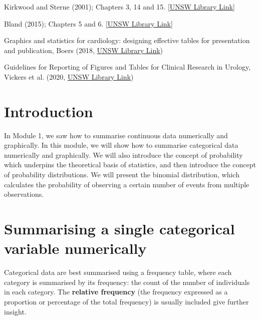 \documentclass[
  a4paper,
]{memoir}
\begin{document}

Kirkwood and Sterne (2001); Chapters 3, 14 and 15.
\href{http://er1.library.unsw.edu.au/er/cgi-bin/eraccess.cgi?url=https://ebookcentral.proquest.com/lib/unsw/detail.action?docID=624728}{{[}UNSW
Library Link{]}}

Bland (2015); Chapters 5 and 6.
\href{http://er1.library.unsw.edu.au/er/cgi-bin/eraccess.cgi?url=https://ebookcentral.proquest.com/lib/unsw/detail.action?docID=5891730}{{[}UNSW
Library Link{]}}

Graphics and statistics for cardiology: designing effective tables for
presentation and publication, Boers (2018,
\href{https://er1.library.unsw.edu.au/er/cgi-bin/eraccess.cgi?url=http://dx.doi.org/10.1136/heartjnl-2017-311581}{UNSW
Library Link})

Guidelines for Reporting of Figures and Tables for Clinical Research in
Urology, Vickers et al. (2020,
\href{https://er1.library.unsw.edu.au/er/cgi-bin/eraccess.cgi?url=http://dx.doi.org/10.1016/j.eururo.2020.04.048}{UNSW
Library Link})

\section{Introduction}\label{introduction-1}

In Module 1, we saw how to summarise continuous data numerically and
graphically. In this module, we will show how to summarise categorical
data numerically and graphically. We will also introduce the concept of
probability which underpins the theoretical basis of statistics, and
then introduce the concept of probability distributions. We will present
the binomial distribution, which calculates the probability of observing
a certain number of events from multiple observations.

\section{Summarising a single categorical variable
numerically}\label{summarising-a-single-categorical-variable-numerically}

Categorical data are best summarised using a frequency table, where each
category is summarised by its frequency: the count of the number of
individuals in each category. The \textbf{relative frequency} (the
frequency expressed as a proportion or percentage of the total
frequency) is usually included give further insight.
\end{document}
